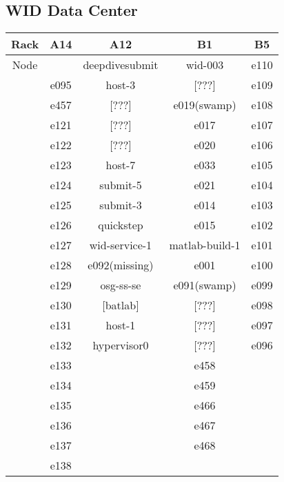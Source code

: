 \documentclass[10pt,letterpaper]{article}
\begin{document}
    \subsection{WID Data Center}
        \begin{center}
        \begin{tabular}{ |c|c|c|c|c|}
        \hline
        Rack & A14 & A12 & B1 & B5 \\
        \hline
        \multirow{1}{3em}{Node}

        &       & deepdivesubmit & wid-003        & e110 \\
        & e095  & host-3         & [???]          & e109 \\
        & e457  & [???]          & e019(swamp)    & e108 \\
        & e121  & [???]          & e017           & e107 \\
        & e122  & [???]          & e020           & e106 \\
        & e123  & host-7         & e033           & e105 \\
        & e124  & submit-5       & e021           & e104 \\
        & e125  & submit-3       & e014           & e103 \\
        & e126  & quickstep      & e015           & e102 \\
        & e127  & wid-service-1  & matlab-build-1 & e101 \\
        & e128  & e092(missing)  & e001           & e100 \\
        & e129  & osg-ss-se      & e091(swamp)    & e099 \\
        & e130  & [batlab]       & [???]          & e098 \\
        & e131  & host-1         & [???]          & e097 \\
        & e132  & hypervisor0    & [???]          & e096 \\
        & e133  &                & e458           &      \\
        & e134  &                & e459           &      \\
        & e135  &                & e466           &      \\
        & e136  &                & e467           &      \\
        & e137  &                & e468           &      \\
        & e138  &                &                &      \\

\end{tabular}
\end{center}
\end{document}
